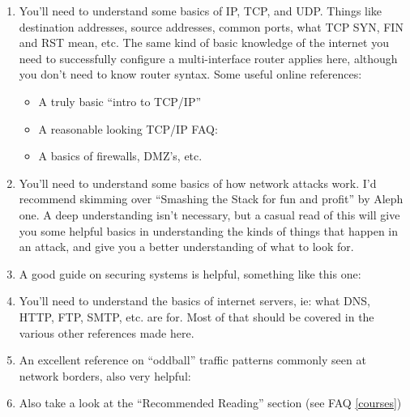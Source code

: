 \documentclass{article}
\newcommand{\myref}[1]{(see FAQ \ref{#1})}
\begin{document}
\begin{enumerate}
\item  You'll need to understand some basics of IP, TCP, and UDP. Things like
    destination addresses, source addresses, common ports, what TCP SYN, FIN
    and RST mean, etc. The same kind of basic knowledge of the internet you
    need to successfully configure a multi-interface router applies here,
    although you don't need to know router syntax. Some useful online
    references:
    \begin{itemize}
      \item A truly basic ``intro to TCP/IP'' 
      \item A reasonable looking TCP/IP FAQ: 
      \item A basics of firewalls, DMZ's, etc.
     
      \end{itemize}
\item  You'll need to understand some basics of how network attacks work. I'd
    recommend skimming over ``Smashing the Stack for fun and profit'' by Aleph
    one. A deep understanding isn't necessary, but a casual read of this will
    give you some helpful basics in understanding the kinds of things that
    happen in an attack, and give you a better understanding of what to look
    for.


\item  A good guide on securing systems is helpful, something like this one:



\item  You'll need to understand the basics of internet servers, ie: what DNS,
    HTTP, FTP, SMTP, etc. are for. Most of that should be covered in the
    various other references made here.
\item  An excellent reference on ``oddball'' traffic patterns commonly seen at
    network borders, also very helpful:

\item  Also take a look at the ``Recommended Reading'' section \myref{courses}
\end{enumerate}
\end{document}
